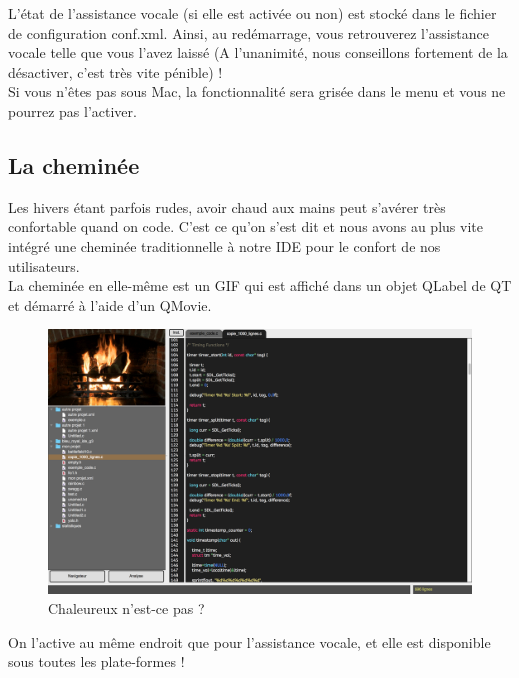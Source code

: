 \documentclass[a4paper,12pt]{article}
\begin{document}
	L'état de l'assistance vocale (si elle est activée ou non) est stocké dans le fichier de configuration conf.xml. Ainsi, au redémarrage, vous retrouverez l'assistance vocale telle que vous l'avez laissé (A l'unanimité, nous conseillons fortement de la désactiver, c'est très vite pénible) !\\
	
	Si vous n'êtes pas sous Mac, la fonctionnalité sera grisée dans le menu et vous ne pourrez pas l'activer.
	
	\newpage
	
	\subsection{La cheminée}
	
		Les hivers étant parfois rudes, avoir chaud aux mains peut s'avérer très confortable quand on code. C'est ce qu'on s'est dit et nous avons au plus vite intégré une cheminée traditionnelle à notre IDE pour le confort de nos utilisateurs.\\
		
		La cheminée en elle-même est un GIF qui est affiché dans un objet QLabel de QT et démarré à l'aide d'un QMovie.\\
		
		\begin{figure}[h!]
			\begin{center}
					\includegraphics[scale=0.3]{images/cheminee}
					\caption{Chaleureux n'est-ce pas ?}
			\end{center}
	\end{figure}
	
	On l'active au même endroit que pour l'assistance vocale, et elle est disponible sous toutes les plate-formes !\\
	
\end{document}

